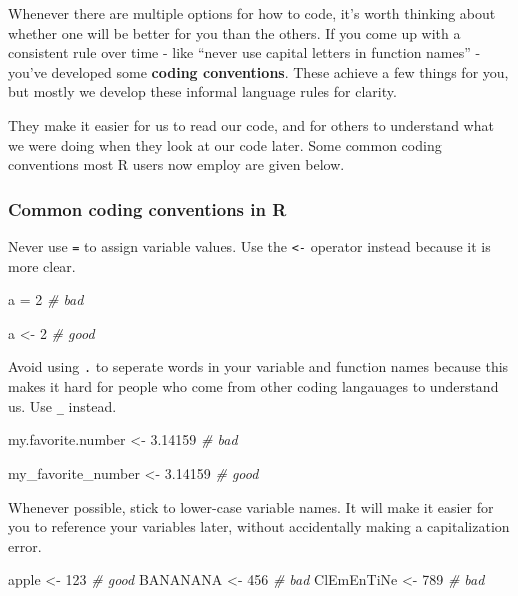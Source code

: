 \documentclass[
]{book}
\newenvironment{Shaded}{\begin{snugshade}}{\end{snugshade}}
\newcommand{\CommentTok}[1]{\textcolor[rgb]{0.56,0.35,0.01}{\textit{#1}}}
\newcommand{\DecValTok}[1]{\textcolor[rgb]{0.00,0.00,0.81}{#1}}
\newcommand{\FloatTok}[1]{\textcolor[rgb]{0.00,0.00,0.81}{#1}}
\newcommand{\NormalTok}[1]{#1}
\newcommand{\OtherTok}[1]{\textcolor[rgb]{0.56,0.35,0.01}{#1}}
\begin{document}
Whenever there are multiple options for how to code, it's worth thinking about whether one will be better for you than the others. If you come up with a consistent rule over time - like ``never use capital letters in function names'' - you've developed some \textbf{coding conventions}. These achieve a few things for you, but mostly we develop these informal language rules for clarity.

They make it easier for us to read our code, and for others to understand what we were doing when they look at our code later. Some common coding conventions most R users now employ are given below.

\hypertarget{common-coding-conventions-in-r}{%
\subsubsection{Common coding conventions in R}\label{common-coding-conventions-in-r}}

Never use \texttt{=} to assign variable values. Use the \texttt{\textless{}-} operator instead because it is more clear.

\begin{Shaded}
\begin{Highlighting}[]
\NormalTok{a }\OtherTok{=} \DecValTok{2} \CommentTok{\# bad}

\NormalTok{a }\OtherTok{\textless{}{-}} \DecValTok{2} \CommentTok{\# good}
\end{Highlighting}
\end{Shaded}

Avoid using \texttt{.} to seperate words in your variable and function names because this makes it hard for people who come from other coding langauages to understand us. Use \texttt{\_} instead.

\begin{Shaded}
\begin{Highlighting}[]
\NormalTok{my.favorite.number }\OtherTok{\textless{}{-}} \FloatTok{3.14159} \CommentTok{\# bad}

\NormalTok{my\_favorite\_number }\OtherTok{\textless{}{-}} \FloatTok{3.14159} \CommentTok{\# good}
\end{Highlighting}
\end{Shaded}

Whenever possible, stick to lower-case variable names. It will make it easier for you to reference your variables later, without accidentally making a capitalization error.

\begin{Shaded}
\begin{Highlighting}[]
\NormalTok{apple }\OtherTok{\textless{}{-}} \DecValTok{123} \CommentTok{\# good }
\NormalTok{BANANANA }\OtherTok{\textless{}{-}} \DecValTok{456} \CommentTok{\# bad}
\NormalTok{ClEmEnTiNe }\OtherTok{\textless{}{-}} \DecValTok{789} \CommentTok{\# bad}
\end{Highlighting}
\end{Shaded}
\end{document}
